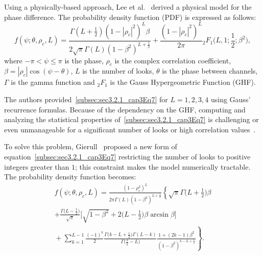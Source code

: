 \documentclass[remotesensing,article,submit,pdftex,moreauthors]{Definitions/mdpi}
\begin{document}
Using a physically-based approach, 
Lee et al.~\cite{IntensityAndPhaseStatisticsOfMultilookPolarimetricAndInterferometricSARimagery} derived a physical model for the phase difference. 
The probability density function (PDF) is expressed as follows:
\begin{equation}\label{subsec:sec3.2.1_cap3Eq7}
	f(\psi; \theta, \rho_c, L)=\frac{\Gamma(L+\frac{1}{2}) (1-|\rho_c|^2)^L\beta}{2\sqrt{\pi}\Gamma(L)(1-\beta^2)^{L+\frac{1}{2}}}
	+\frac{(1-|\rho_c|^2)^L}{2\pi} {_2} F_1 \Big(L,1;\frac{1}{2};\beta^2\Big),
\end{equation}
where $-\pi<\psi\leq\pi$ is the phase,
$\rho_c$ is the complex correlation coefficient, 
$\beta=|\rho_c|\cos(\psi-\theta)$, $L$ is the number of looks, 
$\theta$ is the phase between channels, $\Gamma$ is the gamma function and
${_2}F_1$ is the Gauss Hypergeometric Function (GHF).

The authors provided~\eqref{subsec:sec3.2.1_cap3Eq7} for $L=1,2,3,4$ using Gauss' recurrence formulas. 
Because of the dependency on the GHF, computing and analyzing the statistical properties of~\eqref{subsec:sec3.2.1_cap3Eq7} is challenging or even unmanageable for a significant number of looks or high correlation values~\cite{FastandAccurateComputationoftheMultilookInterferometricPhaseProbabilityDensityFunction,GaussianApproximationofIinterferometricPDFforMLEderivation}.

To solve this problem, Gierull~\cite{ClosedFormExpressionsforInSARSampleStatisticsandItsApplicationtoNonGaussianData} proposed a new form of equation~\eqref{subsec:sec3.2.1_cap3Eq7} restricting the number of looks to positive integers greater than $1$; this constraint makes the model numerically tractable. 
The probability density function becomes:
\begin{multline}\label{subsec:sec3.2.1_cap3Eq8}
	f(\psi; \theta, \rho_c, L)
	=\frac{(1-\rho_c^2)^L}{2\pi\Gamma(L)(1-\beta^2)^{L+\frac{1}{2}}}\left\lbrace \sqrt{\pi}\Gamma\Big(L+\frac{1}{2}\Big)\beta\right.\\
	+\frac{\Gamma\big(L-\frac{1}{2}\big) }{\sqrt{\pi}}\bigg[ \sqrt{1-\beta^2}+2\Big(L-\frac{1}{2}\Big)\beta\arcsin\beta\bigg]\\ 
	\mbox{}+\sum_{k=1}^{L-1}\frac{(-1)^k}{2}\frac{\Gamma\big( k-L+\frac{1}{2}\big) \Gamma(L-k)}{\Gamma\big( \frac{3}{2}-L\big) }
	\left.\frac{1+(2k-1)\beta^2}{(1-\beta^2)^{k-L+\frac{1}{2}}}\right\rbrace.
\end{multline}
\end{document}
